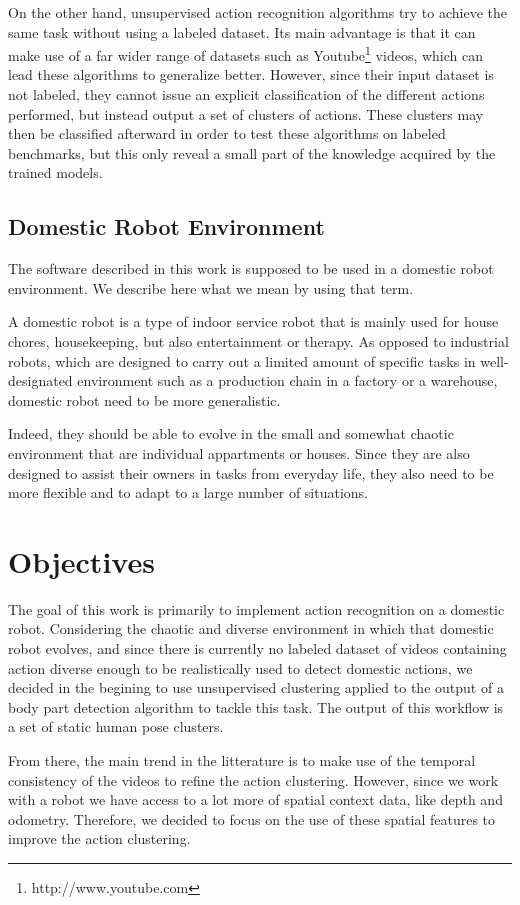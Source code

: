 On the other hand, unsupervised action recognition algorithms try to achieve the same task without using a labeled dataset. Its main advantage is that it can make use of a far wider range of datasets such as Youtube\footnote{http://www.youtube.com} videos, which can lead these algorithms to generalize better. However, since their input dataset is not labeled, they cannot issue an explicit classification of the different actions performed, but instead output a set of clusters of actions. These clusters may then be classified afterward in order to test these algorithms on labeled benchmarks, but this only reveal a small part of the knowledge acquired by the trained models.

\subsection{Domestic Robot Environment}
The software described in this work is supposed to be used in a domestic robot environment. We describe here what we mean by using that term.

A domestic robot is a type of indoor service robot that is mainly used for house chores, housekeeping, but also entertainment or therapy.
As opposed to industrial robots, which are designed to carry out a limited amount of specific tasks in well-designated environment such as a production chain in a factory or a warehouse, domestic robot need to be more generalistic.

Indeed, they should be able to evolve in the small and somewhat chaotic environment that are individual appartments or houses. Since they are also designed to assist their owners in tasks from everyday life, they also need to be more flexible and to adapt to a large number of situations.

\section{Objectives}
The goal of this work is primarily to implement action recognition on a domestic robot. Considering the chaotic and diverse environment in which that domestic robot evolves, and since there is currently no labeled dataset of videos containing action diverse enough to be realistically used to detect domestic actions, we decided in the begining to use unsupervised clustering applied to the output of a body part detection algorithm to tackle this task. The output of this workflow is a set of static human pose clusters. 

From there, the main trend in the litterature is to make use of the temporal consistency of the videos to refine the action clustering. However, since we work with a robot we have access to a lot more of spatial context data, like depth and odometry. Therefore, we decided to focus on the use of these spatial features to improve the action clustering.

